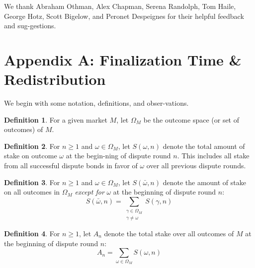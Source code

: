 \documentclass[12pt,floatfix,reprint,nofootinbib,amsmath,amssymb,epsfig,pre,floats,letterpaper,groupedaffiliation]{revtex4-1}
\theoremstyle{definition}
\theoremstyle{definition}
\newtheorem{definition}{Definition}
\begin{document}
\begin{acknowledgments}\label{section:acknowledgements}
We thank Abraham Othman, Alex Chapman, Serena Randolph, Tom Haile, George Hotz, Scott Bigelow, and Peronet Despeignes for their helpful feedback and sug-\linebreak gestions.
\end{acknowledgments}

\nocite{Peterson_2014}



\clearpage

\appendix

\section*{Appendix A: Finalization Time \& Redistribution}

We begin with some notation, definitions, and obser-\linebreak vations.

\begin{definition}
For a given market $M$, let $\Omega_M$ be the outcome space (or set of outcomes) of $M$.
\end{definition}

\begin{definition}
For $n \geq 1$ and $\omega \in \Omega_M$, let $S(\omega, n)$ denote the total amount of stake on outcome $\omega$ at the begin-\linebreak ning of dispute round $n$. This includes all stake from all successful dispute bonds in favor of $\omega$ over all previous dispute rounds.
\end{definition}

\begin{definition}
For $n \geq 1$ and $\omega \in \Omega_M$, let $S(\bar{\omega}, n)$ denote the amount of stake on all outcomes in $\Omega_M$ \textit{except for} $\omega$ at the beginning of dispute round $n$:
\[
S(\bar{\omega}, n) = \sum_{\substack{\gamma \in \Omega_M \\ \gamma \neq \omega}} S(\gamma, n)
\]
\end{definition}

\begin{definition}
For $n \geq 1$, let $A_n$ denote the total stake over all outcomes of $M$ at the beginning of dispute round $n$:
\[
A_n = \sum_{\omega \in \Omega_M} S(\omega, n)
\]
\end{definition}
\end{document}
